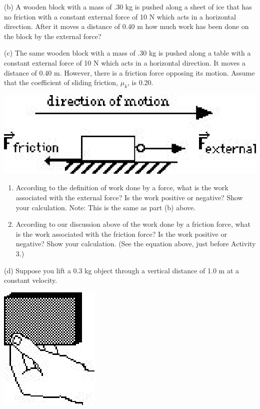 (b) A wooden block with a mass of .30 kg is pushed along a sheet of ice that
has no friction with a constant external force of 10 N which acts in a 
horizontal direction. After it moves a distance of 0.40 m how much work has 
been done on the block by the external force?
\vspace{20mm}

(c) The same wooden block with a mass of .30 kg is pushed along a table with
a constant external force of 10 N which acts in a horizontal direction. It moves
a distance of 0.40 m. However, there is a friction force opposing its motion.
Assume that the coefficient of sliding friction, \( \mu _{k} \), is 0.20. 

\vspace{0.3cm}
{\par\centering \includegraphics{work_power_fig4.eps} \par}
\vspace{0.3cm}

\begin{enumerate}
\item According to the definition of work done by a force, what is the work associated with the external force? Is the work positive or negative? Show your calculation. Note: This is the same as part (b) above.
\vspace{20mm}

\item According to our discussion above of the work done by a friction force, what is the work associated with the friction force? Is the work positive or negative? Show your calculation. (See the equation above, just before Activity 3.)
\vspace{20mm}

\end{enumerate}
(d) Suppose you lift a 0.3 kg object through a vertical distance of 1.0 m at a constant velocity.

\vspace{0.3cm}
{\par\centering \includegraphics{work_power_fig5.eps} \par}
\vspace{0.3cm}


